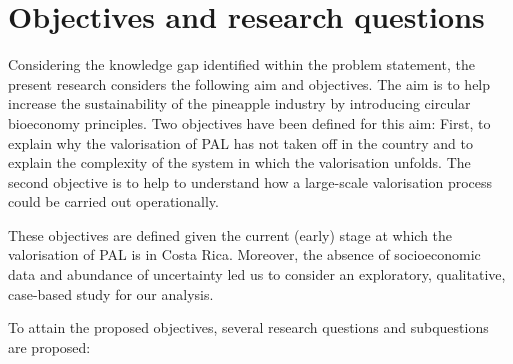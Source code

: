 \section{Objectives and research questions}
\label{researchQ}

Considering the knowledge gap identified within the problem statement, the present research considers the following aim and objectives. The aim is to help increase the sustainability of the pineapple industry by introducing circular bioeconomy principles. Two objectives have been defined for this aim: First, to explain why the valorisation of PAL has not taken off in the country and to explain the complexity of the system in which the valorisation unfolds. The second objective is to help to understand how a large-scale valorisation process could be carried out operationally. 

These objectives are defined given the current (early) stage at which the valorisation of PAL is in Costa Rica. Moreover, the absence of socioeconomic data and abundance of uncertainty led us to consider an exploratory, qualitative, case-based study for our analysis.

To attain the proposed objectives, several research questions and subquestions are proposed:

